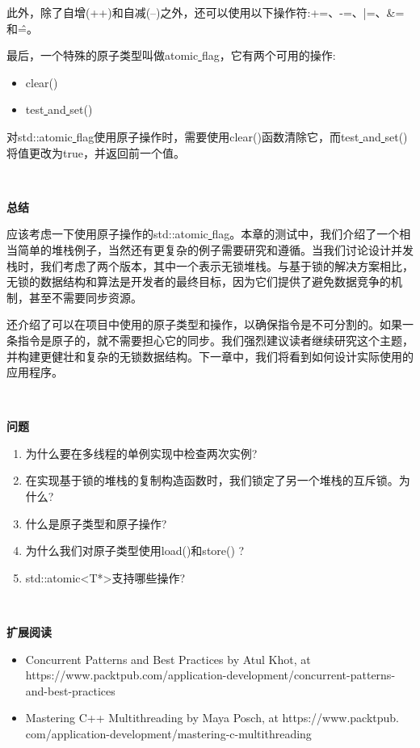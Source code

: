 此外，除了自增(++)和自减(--)之外，还可以使用以下操作符:+=、-=、|=、\&=和\^=。 \par
最后，一个特殊的原子类型叫做atomic\underline{ }flag，它有两个可用的操作: \par

\begin{itemize}
	\item clear()
	\item test\underline{ }and\underline{ }set()
\end{itemize}

对std::atomic\underline{ }flag使用原子操作时，需要使用clear()函数清除它，而test\underline{ }and\underline{ }set()将值更改为true，并返回前一个值。 \par

\noindent\textbf{}\ \par
\textbf{总结} \ \par
应该考虑一下使用原子操作的std::atomic\underline{ }flag。本章的测试中，我们介绍了一个相当简单的堆栈例子，当然还有更复杂的例子需要研究和遵循。当我们讨论设计并发栈时，我们考虑了两个版本，其中一个表示无锁堆栈。与基于锁的解决方案相比，无锁的数据结构和算法是开发者的最终目标，因为它们提供了避免数据竞争的机制，甚至不需要同步资源。 \par
还介绍了可以在项目中使用的原子类型和操作，以确保指令是不可分割的。如果一条指令是原子的，就不需要担心它的同步。我们强烈建议读者继续研究这个主题，并构建更健壮和复杂的无锁数据结构。下一章中，我们将看到如何设计实际使用的应用程序。 \par

\noindent\textbf{}\ \par
\textbf{问题} \ \par
\begin{enumerate}
	\item 为什么要在多线程的单例实现中检查两次实例?
	\item 在实现基于锁的堆栈的复制构造函数时，我们锁定了另一个堆栈的互斥锁。为什么?
	\item 什么是原子类型和原子操作?
	\item 为什么我们对原子类型使用load()和store() ?
	\item std::atomic<T*>支持哪些操作?
\end{enumerate}

\noindent\textbf{}\ \par
\textbf{扩展阅读} \ \par
\begin{itemize}
	\item Concurrent Patterns and Best Practices by Atul Khot, at https://www.packtpub.com/application-development/concurrent-patterns-and-best-practices
	\item Mastering C++ Multithreading by Maya Posch, at  https:/​/​www.​packtpub.​com/application-​development/​mastering-​c-​multithreading
\end{itemize}

\newpage

































